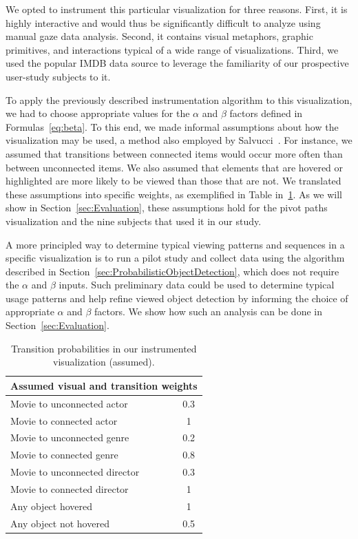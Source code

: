 We opted to instrument this particular visualization for three reasons. First, it is highly interactive and would thus be significantly difficult to analyze using manual gaze data analysis. Second, it contains visual metaphors, graphic primitives, and interactions typical of a wide range of visualizations. Third, we used the popular IMDB data source to leverage the familiarity of our prospective user-study subjects to it.  

To apply the previously described instrumentation algorithm to this visualization, we had to choose appropriate values for the $\alpha$ and $\beta$ factors defined in Formulas~\ref{eq:beta}. To this end, we made informal assumptions about how the visualization may be used, a method also employed by Salvucci~\cite{salvucci2000intelligent}. For instance, we assumed that transitions between connected items would occur more often than between unconnected items. We also assumed that elements that are hovered or highlighted are more likely to be viewed than those that are not. We translated these assumptions into specific weights, as exemplified in Table in~\ref{tab:Transition2}. As we will show in Section~\ref{sec:Evaluation}, these assumptions hold for the pivot paths visualization and the nine subjects that used it in our study.

A more principled way to determine typical viewing patterns and sequences in a specific visualization is to run a pilot study and collect data using the algorithm described in Section~\ref{sec:ProbabilisticObjectDetection}, which does not require the $\alpha$ and $\beta$ inputs. Such preliminary data could be used to determine typical usage patterns and help refine viewed object detection by informing the choice of appropriate $\alpha$ and $\beta$ factors. We show how such an analysis can be done in Section~\ref{sec:Evaluation}. 

\begin{table}[htbp]
	\centering
		\begin{tabular}{|l|c|}
			\hline
			 \multicolumn{2}{|c|}{Assumed visual and transition weights} \\ \hline
			Movie to unconnected actor & 0.3\\\hline
			Movie to connected actor & 1\\\hline
			Movie to unconnected genre & 0.2\\\hline
			Movie to connected genre & 0.8\\\hline
			Movie to unconnected director & 0.3\\\hline
			Movie to connected director & 1\\\hline
			Any object hovered & 1\\\hline
			Any object not hovered & 0.5\\
			\hline			
		\end{tabular}
	\caption{Transition probabilities in our instrumented visualization (assumed).}
	\label{tab:Transition2}
\end{table}


